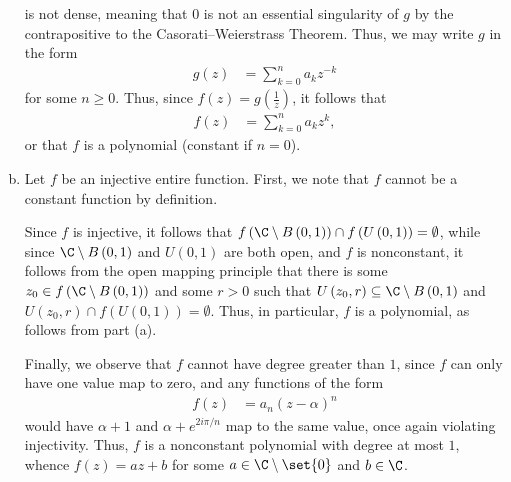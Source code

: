 \documentclass[10pt]{mypackage}
\begin{document}
\begin{solution}
\begin{enumerate}[(a)]
      is not dense, meaning that $0$ is not an essential singularity of $g$ by the contrapositive to the Casorati--Weierstrass Theorem. Thus, we may write $g$ in the form
      \begin{align*}
        g(z) &= \sum_{k=0}^{n} a_k z^{-k}
      \end{align*}
      for some $n \geq 0$. Thus, since $f(z) = g\left( \frac{1}{z} \right)$, it follows that
      \begin{align*}
        f(z) &= \sum_{k=0}^{n}a_kz^{k},
      \end{align*}
      or that $f$ is a polynomial (constant if $n = 0$).
    \item Let $f$ be an injective entire function. First, we note that $f$ cannot be a constant function by definition.\newline

      Since $f$ is injective, it follows that $f\left( \C\setminus B\left( 0,1 \right) \right)\cap f\left( U\left( 0,1 \right) \right) = \emptyset$, while since $\C\setminus B\left( 0,1 \right)$ and $U\left( 0,1 \right)$ are both open, and $f$ is nonconstant, it follows from the open mapping principle that there is some $z_0\in f\left( \C\setminus B\left( 0,1 \right) \right)$ and some $r > 0$ such that $U\left( z_0,r \right)\subseteq \C\setminus B\left( 0,1 \right)$ and $U\left( z_0,r \right)\cap f\left( U\left( 0,1 \right) \right) = \emptyset$. Thus, in particular, $f$ is a polynomial, as follows from part (a).\newline

      Finally, we observe that $f$ cannot have degree greater than $1$, since $f$ can only have one value map to zero, and any functions of the form
      \begin{align*}
        f(z) &= a_n\left( z-\alpha \right)^{n}
      \end{align*}
      would have $\alpha + 1$ and $\alpha + e^{2i\pi/n}$ map to the same value, once again violating injectivity. Thus, $f$ is a nonconstant polynomial with degree at most $1$, whence $f(z) = az + b$ for some $a\in \C\setminus \set{0}$ and $b\in\C$.
  \end{enumerate}
\end{solution}
\end{document}
